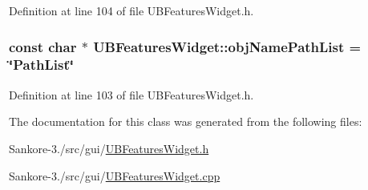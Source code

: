 Definition at line 104 of file U\-B\-Features\-Widget.\-h.

\hypertarget{class_u_b_features_widget_aa984f0c0bb6559cce4bb9ae7ebf88b33}{
\subsubsection[{obj\-Name\-Path\-List}]{\setlength{\rightskip}{0pt plus 5cm}const char $\ast$ U\-B\-Features\-Widget\-::obj\-Name\-Path\-List = \char`\"{}Path\-List\char`\"{}\hspace{0.3cm}{\ttfamily [static]}}}\label{d5/d85/class_u_b_features_widget_aa984f0c0bb6559cce4bb9ae7ebf88b33}


Definition at line 103 of file U\-B\-Features\-Widget.\-h.



The documentation for this class was generated from the following files\-:\begin{DoxyCompactItemize}
\item 
Sankore-\/3./src/gui/\hyperlink{_u_b_features_widget_8h}{U\-B\-Features\-Widget.\-h}\item 
Sankore-\/3./src/gui/\hyperlink{_u_b_features_widget_8cpp}{U\-B\-Features\-Widget.\-cpp}\end{DoxyCompactItemize}
